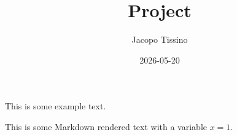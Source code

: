 \documentclass[
]{article}
\title{Project}
\author{Jacopo Tissino}
\date{2026-05-20}
\begin{document}
\maketitle


This is some example text.

This is some Markdown rendered text with a variable \(x=1\).
\end{document}
